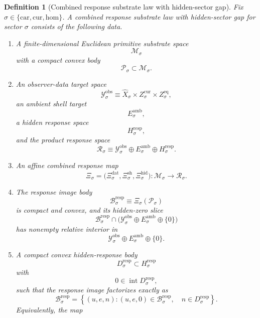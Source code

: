 \documentclass[11pt]{article}
\newcommand{\Car}{\mathrm{car}}
\newcommand{\Cur}{\mathrm{cur}}
\newcommand{\Hom}{\mathrm{hom}}
\newcommand{\VisibleAffine}[1]{\widehat X_{#1}}
\newcommand{\DataSpace}[1]{\mathcal Y_{#1}^{\mathrm{obs}}}
\newcommand{\AmbientTarget}[1]{E_{#1}^{\mathrm{amb}}}
\newcommand{\ProtoSpace}[1]{\mathcal M_{#1}}
\newcommand{\ProtoBody}[1]{\mathcal P_{#1}}
\newcommand{\ResponseSpace}[1]{\mathcal R_{#1}}
\newcommand{\ResponseMap}[1]{\Xi_{#1}}
\newcommand{\ResponseData}[1]{\Xi_{#1}^{\mathrm{dat}}}
\newcommand{\ResponseShell}[1]{\Xi_{#1}^{\mathrm{sh}}}
\newcommand{\ResponseHidden}[1]{\Xi_{#1}^{\mathrm{hid}}}
\newcommand{\ResponseImage}[1]{\mathcal B_{#1}^{\mathrm{resp}}}
\newcommand{\RespGapSpace}[1]{H_{#1}^{\mathrm{resp}}}
\newcommand{\RespGapBody}[1]{D_{#1}^{\mathrm{resp}}}
\newtheorem{definition}{Definition}
\begin{document}
\begin{definition}[Combined response substrate law with hidden-sector gap]
\label{def:combined}
Fix \(\sigma\in\{\Car,\Cur,\Hom\}\). A \emph{combined response substrate law with hidden-sector gap} for sector \(\sigma\) consists of the following data.
\begin{enumerate}
    \item A finite-dimensional Euclidean primitive substrate space
    \[
    \ProtoSpace{\sigma}
    \]
    with a compact convex body
    \[
    \ProtoBody{\sigma}\subset \ProtoSpace{\sigma}.
    \]
    \item An observer-data target space
    \[
    \DataSpace{\sigma}
    \equiv
    \VisibleAffine{\sigma}\times Z_{\sigma}^{\mathrm{cur}}\times Z_{\sigma}^{\mathrm{eq}},
    \]
    an ambient shell target
    \[
    \AmbientTarget{\sigma},
    \]
    a hidden response space
    \[
    \RespGapSpace{\sigma},
    \]
    and the product response space
    \[
    \ResponseSpace{\sigma}
    \equiv
    \DataSpace{\sigma}\oplus \AmbientTarget{\sigma}\oplus \RespGapSpace{\sigma}.
    \]
    \item An affine combined response map
    \[
    \ResponseMap{\sigma}
    =
    \bigl(
    \ResponseData{\sigma},
    \ResponseShell{\sigma},
    \ResponseHidden{\sigma}
    \bigr):
    \ProtoSpace{\sigma}\to \ResponseSpace{\sigma}.
    \]
    \item The response image body
    \begin{equation}
    \ResponseImage{\sigma}
    \equiv
    \ResponseMap{\sigma}(\ProtoBody{\sigma})
    \label{eq:imagebody}
    \end{equation}
    is compact and convex, and its hidden-zero slice
    \[
    \ResponseImage{\sigma}\cap
    \bigl(
    \DataSpace{\sigma}\oplus \AmbientTarget{\sigma}\oplus\{0\}
    \bigr)
    \]
    has nonempty relative interior in
    \[
    \DataSpace{\sigma}\oplus \AmbientTarget{\sigma}\oplus\{0\}.
    \]
    \item A compact convex hidden-response body
    \[
    \RespGapBody{\sigma}\subset \RespGapSpace{\sigma}
    \]
    with
    \[
    0\in\operatorname{int}\RespGapBody{\sigma},
    \]
    such that the response image factorizes exactly as
    \begin{equation}
    \ResponseImage{\sigma}
    =
    \left\{
    (u,e,n):
    (u,e,0)\in\ResponseImage{\sigma},
    \quad
    n\in\RespGapBody{\sigma}
    \right\}.
    \label{eq:responsefactor}
    \end{equation}
    Equivalently, the map

\end{enumerate}
\end{definition}
\end{document}
